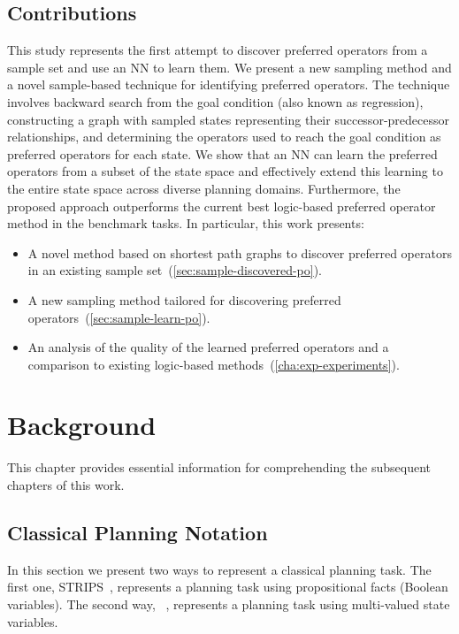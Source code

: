 \documentclass[ppgc,diss,english]{iiufrgs}
\begin{document}
\section{Contributions}
\label{sec:intro-contributions}
This study represents the first attempt to discover preferred operators from a sample set and use an NN to learn them. We present a new sampling method and a novel sample-based technique for identifying preferred operators. The technique involves backward search from the goal condition (also known as regression), constructing a graph with sampled states representing their successor-predecessor relationships, and determining the operators used to reach the goal condition as preferred operators for each state. We show that an NN can learn the preferred operators from a subset of the state space and effectively extend this learning to the entire state space across diverse planning domains. Furthermore, the proposed approach outperforms the current best logic-based preferred operator method in the benchmark tasks. In particular, this work presents:

\begin{itemize}
\item A novel method based on shortest path graphs to discover preferred operators in an existing sample set~(\cref{sec:sample-discovered-po}).
\item A new sampling method tailored for discovering preferred operators~(\cref{sec:sample-learn-po}).
\item An analysis of the quality of the learned preferred operators and a comparison to existing logic-based methods~(\cref{cha:exp-experiments}).
\end{itemize}
%
%
\chapter{Background}
\label{cha:background}
This chapter provides essential information for comprehending the subsequent chapters of this work.


\section{Classical Planning Notation}
\label{sec:background-planning-notation}
In this section we present two ways to represent a classical planning task. The first one, STRIPS~\cite{Fikes.Nilsson/1971}, represents a planning task using propositional facts (Boolean variables). The second way, \sas~\cite{Backstrom.Nebel/1995}, represents a planning task using multi-valued state variables. %
\end{document}
